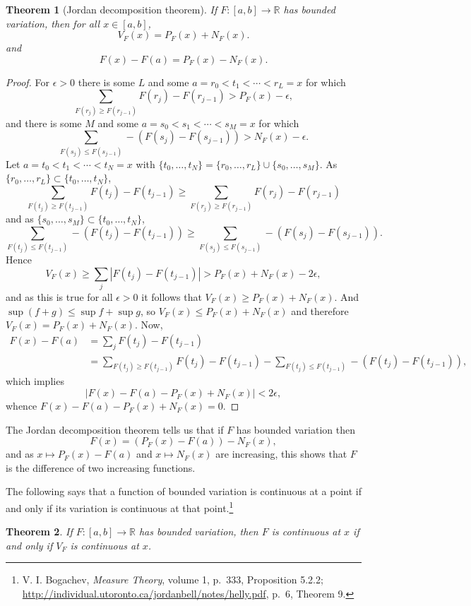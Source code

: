 \documentclass{article}
\newtheorem{theorem}{Theorem}
\theoremstyle{definition}
\begin{document}
\begin{theorem}[Jordan decomposition theorem]
If $F:[a,b] \to \mathbb{R}$ has bounded variation, then for all $x \in [a,b]$,
\[
V_F(x)=P_F(x)+N_F(x).
\]
and
\[
F(x)-F(a) = P_F(x)-N_F(x).
\]
\end{theorem}
\begin{proof}
For $\epsilon>0$ there is some $L$ and some $a=r_0<t_1<\cdots<r_L=x$ for which
\[
 \sum_{F(r_j) \geq F(r_{j-1})} F(r_j)-F(r_{j-1})>P_F(x)-\epsilon,
\]
and there is some $M$ and some $a=s_0<s_1<\cdots<s_M=x$ for which
\[
\sum_{F(s_j) \leq F(s_{j-1})} -(F(s_j)-F(s_{j-1}))>N_F(x)-\epsilon.
\]
Let $a = t_0<t_1<\cdots<t_N=x$ with $\{t_0,\ldots,t_N\} = \{r_0,\ldots,r_L\}
\cup \{s_0,\ldots,s_M\}$.
As $\{r_0,\ldots,r_L\} \subset \{t_0,\ldots,t_N\}$,
\[
 \sum_{F(t_j) \geq F(t_{j-1})} F(t_j)-F(t_{j-1}) \geq  \sum_{F(r_j) \geq F(r_{j-1})} F(r_j)-F(r_{j-1})
\]
and as $\{s_0,\ldots,s_M\} \subset \{t_0,\ldots,t_N\}$,
\[
\sum_{F(t_j) \leq F(t_{j-1})} -(F(t_j)-F(t_{j-1})) \geq \sum_{F(s_j) \leq F(s_{j-1})} -(F(s_j)-F(s_{j-1})).
\]
Hence
\[
V_F(x) \geq \sum_j |F(t_j) - F(t_{j-1})| >  P_F(x)+N_F(x) - 2\epsilon,
\]
and as this is true for all $\epsilon>0$ it follows that  $V_F(x) \geq P_F(x)+N_F(x)$. And $\sup (f+g) \leq \sup f + \sup g$, so
$V_F(x) \leq P_F(x)+N_F(x)$ and therefore $V_F(x)=P_F(x)+N_F(x)$.
Now,
\begin{align*}
F(x)-F(a) &= \sum_j F(t_j)-F(t_{j-1})\\
& = \sum_{F(t_j) \geq F(t_{j-1})} F(t_j)-F(t_{j-1})
-\sum_{F(t_j) \leq  F(t_{j-1})} -(F(t_j)-F(t_{j-1})),
\end{align*}
which implies
\[
|F(x)-F(a)-P_F(x)+N_F(x)| < 2\epsilon,
\]
whence $F(x)-F(a) - P_F(x) + N_F(x)=0$. 
\end{proof}

The Jordan decomposition theorem tells us that if $F$ has bounded variation then
\[
F(x) = (P_F(x)-F(a)) - N_F(x),
\]
and as $x \mapsto P_F(x)-F(a)$ and $x \mapsto N_F(x)$ are increasing, this shows that
$F$ is the difference of two increasing functions. 


The following says that a function of bounded variation is continuous at a point
if and only if its variation is continuous at that point.\footnote{V. I. Bogachev, {\em Measure Theory}, volume 1, p.~333, Proposition 5.2.2;
\url{http://individual.utoronto.ca/jordanbell/notes/helly.pdf}, p.~6, Theorem 9.}

\begin{theorem}
If $F:[a,b] \to \mathbb{R}$ has bounded variation, then $F$ is continuous at $x$ if and
only if $V_F$ is continuous at $x$. 
\label{continuity}
\end{theorem}
\end{document}
